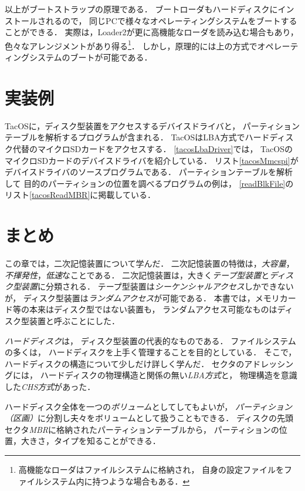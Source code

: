 以上がブートストラップの原理である．
ブートローダもハードディスクにインストールされるので，
同じPCで様々なオペレーティングシステムをブートすることができる．
実際は，Loader2が更に高機能なローダを読み込む場合もあり，
色々なアレンジメントがあり得る\footnote{
  高機能なローダはファイルシステムに格納され，
  自身の設定ファイルをファイルシステム内に持つような場合もある．}．
しかし，原理的には上の方式でオペレーティングシステムのブートが可能である．

\section{実装例}
TacOSに，ディスク型装置をアクセスするデバイスドライバと，
パーティションテーブルを解析するプログラムが含まれる．
TacOSはLBA方式でハードディスク代替のマイクロSDカードをアクセスする．
\ref{tacosLbaDriver}では，
TacOSのマイクロSDカードのデバイスドライバを紹介している．
リスト\ref{tacosMmcspi}がデバイスドライバのソースプログラムである．
パーティションテーブルを解析して
目的のパーティションの位置を調べるプログラムの例は，
\ref{readBlkFile}のリスト\ref{tacosReadMBR}に掲載している．

\section{まとめ}
この章では，二次記憶装置について学んだ．
二次記憶装置の特徴は，\emph{大容量}，
\emph{不揮発性}，\emph{低速}なことである．
二次記憶装置は，大きく\emph{テープ型装置}と\emph{ディスク型装置}に分類される．
テープ型装置は\emph{シーケンシャルアクセス}しかできないが，
ディスク型装置は\emph{ランダムアクセス}が可能である．
本書では，メモリカード等の本来はディスク型ではない装置も，
ランダムアクセス可能なものはディスク型装置と呼ぶことにした．

\emph{ハードディスク}は，
ディスク型装置の代表的なものである．
ファイルシステムの多くは，
ハードディスクを上手く管理することを目的としている．
そこで，ハードディスクの構造について少しだけ詳しく学んだ．
セクタのアドレッシングには，
ハードディスクの物理構造と関係の無い\emph{LBA方式}と，
物理構造を意識した\emph{CHS方式}があった．

ハードディスク全体を一つの\emph{ボリューム}としてしてもよいが，
\emph{パーティション（区画）}に分割し夫々をボリュームとして扱うこともできる．
ディスクの先頭セクタ\emph{MBR}に格納されたパーティションテーブルから，
パーティションの位置，大きさ，タイプを知ることができる．

